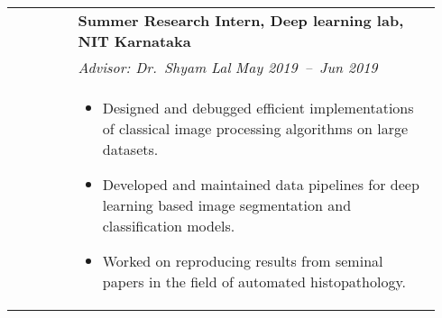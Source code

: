\documentclass[letterpaper, 10pt, oneside]{article}
\newcommand{\bdit}[1]{{\textbf{#1}}}
\begin{document}
\begin{longtable}{@{} p{0.14\linewidth} p{0.8\linewidth}}
                          & \bdit{Summer Research Intern, Deep learning lab, NIT Karnataka}                                                          \\
                          & \textsl{Advisor: Dr.\ Shyam Lal} \hfill \hspace{-3em} \textsl{May 2019\ --\ Jun 2019}                                    \\
                          & \parbox{0.8\textwidth}{                                                                                                  %
        \begin{itemize}[leftmargin=*, itemsep=-0.88ex, topsep=-0.88ex]
            \item Designed and debugged efficient implementations of classical image processing algorithms on large datasets.
            \item Developed and maintained data pipelines for deep learning based image segmentation and classification models.
            \item Worked on reproducing results from seminal papers in the field of automated histopathology.
        \end{itemize}
    }
    \\
    \\


\end{longtable}
\end{document}
